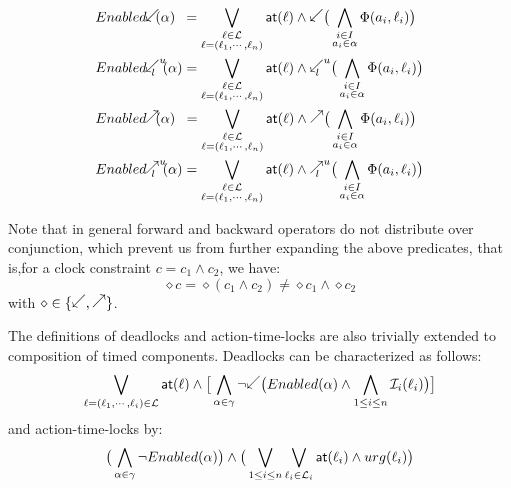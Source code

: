 \begin{align*}
  &\enabledbackward{\alpha}\hspace{1.8mm}=\bigvee_{\substack{\loc\in\Loc\\
  \loc=(\loc_1,\cdots,\loc_n)}}\al{\loc}\wedge \backward\big(\bigwedge_{\substack{
    i\in{I}\\a_i\in\alpha}}\Phi(a_i,\loc_i)\big) \\
  &\enabledbackwardb{\alpha}{l}{u}=\bigvee_{\substack{\loc\in\Loc\\
  \loc=(\loc_1,\cdots,\loc_n)}}\al{\loc}\wedge \backwardp{l}{u}\big(\bigwedge_{
    \substack{i\in{I}\\a_i\in\alpha}}\Phi(a_i,\loc_i)\big) \\
  &\enabledforward{\alpha}\hspace{1.9mm}=\bigvee_{\substack{\loc\in\Loc\\
  \loc=(\loc_1,\cdots,\loc_n)}}\al{\loc}\wedge \forward\big(\bigwedge_{\substack{
    i\in{I}\\a_i\in\alpha}}\Phi(a_i,\loc_i)\big) \\
  &\enabledforwardb{\alpha}{l}{u}=\bigvee_{\substack{\loc\in\Loc\\
  \loc=(\loc_1,\cdots,\loc_n)}}\al{\loc}\wedge \forwardp{l}{u}\big(\bigwedge_{\substack{
    i\in{I}\\a_i\in\alpha}}\Phi(a_i,\loc_i)\big) \\
\end{align*}

Note that in general forward and backward operators do not distribute over conjunction, which
prevent us from further expanding the above predicates, that is,for a clock constraint 
$c=c_1\wedge c_2$, we have:
\begin{displaymath}
  \diamond c = \diamond (c_1\wedge c_2) \neq \diamond c_1\wedge \diamond c_2
\end{displaymath}
with $\diamond\in\{\backward,\forward\}$.

The definitions of deadlocks and action-time-locks are also trivially extended
to composition of timed components. Deadlocks can be characterized as follows:
\begin{displaymath}
  \bigvee_{\loc=(\loc_1,\cdots,\loc_i)\in\Loc}\al{\loc}\wedge
  \big[\bigwedge_{\alpha\in\gamma}\neg\backward\big(\enabled{\alpha}\wedge
  \bigwedge_{1\le i\le n}\Invb{i}{\loc_i}\big)\big]
\end{displaymath}
and action-time-locks by:
\begin{displaymath}
  \big(\bigwedge_{\alpha\in\gamma}\neg Enabled(\alpha)\big)\wedge\big(
  \bigvee_{1\le i\le n}\bigvee_{\ell_i\in\mathcal{L}_i}\textsf{at}(\ell_i)\wedge urg(\ell_i)\big)
\end{displaymath}

